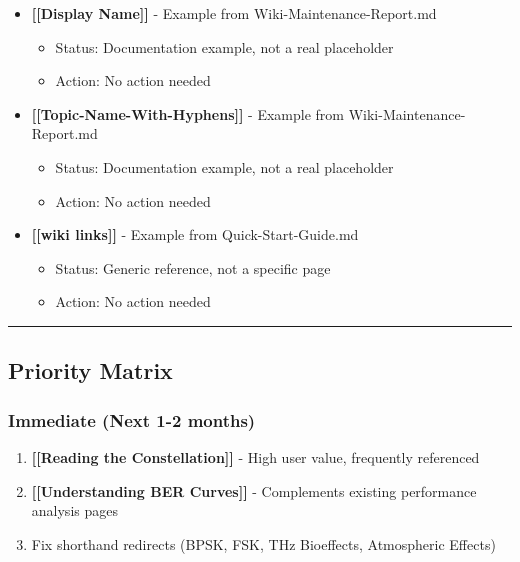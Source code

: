\begin{itemize}
\tightlist
\item
  \textbf{{[}{[}Display Name{]}{]}} - Example from
  Wiki-Maintenance-Report.md

  \begin{itemize}
  \tightlist
  \item
    Status: Documentation example, not a real placeholder
  \item
    Action: No action needed
  \end{itemize}
\item
  \textbf{{[}{[}Topic-Name-With-Hyphens{]}{]}} - Example from
  Wiki-Maintenance-Report.md

  \begin{itemize}
  \tightlist
  \item
    Status: Documentation example, not a real placeholder
  \item
    Action: No action needed
  \end{itemize}
\item
  \textbf{{[}{[}wiki links{]}{]}} - Example from Quick-Start-Guide.md

  \begin{itemize}
  \tightlist
  \item
    Status: Generic reference, not a specific page
  \item
    Action: No action needed
  \end{itemize}
\end{itemize}

\begin{center}\rule{0.5\linewidth}{0.5pt}\end{center}

\subsection{\texorpdfstring{ Priority
Matrix}{ Priority Matrix}}\label{priority-matrix}

\subsubsection{Immediate (Next 1-2
months)}\label{immediate-next-1-2-months}

\begin{enumerate}
\def\labelenumi{\arabic{enumi}.}
\tightlist
\item
  \textbf{{[}{[}Reading the Constellation{]}{]}} - High user value,
  frequently referenced
\item
  \textbf{{[}{[}Understanding BER Curves{]}{]}} - Complements existing
  performance analysis pages
\item
  Fix shorthand redirects (BPSK, FSK, THz Bioeffects, Atmospheric
  Effects)
\end{enumerate}

